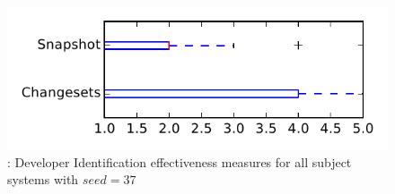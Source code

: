 
\begin{figure}
\centering
\includegraphics[height=0.4\textheight]{figures/dit_seed/rq1_tiny_37}
\caption{\rtwo: Developer Identification effectiveness measures for all subject systems with $seed=37$}
\label{fig:dit_seed:rq1:tiny}
\end{figure}
